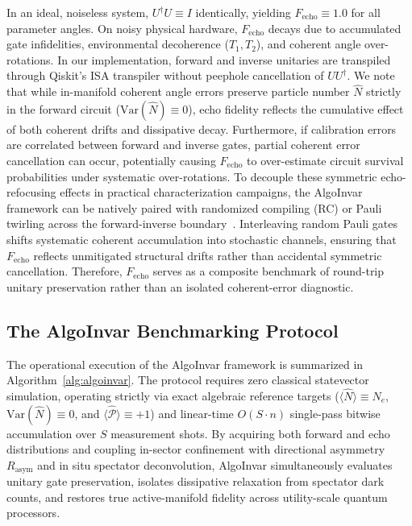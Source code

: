 \documentclass[aps,pra,reprint,superscriptaddress,floatfix,nofootinbib]{revtex4-2}
\begin{document}
In an ideal, noiseless system, $U^\dagger U \equiv I$ identically, yielding $F_{\text{echo}} \equiv 1.0$ for all parameter angles. On noisy physical hardware, $F_{\text{echo}}$ decays due to accumulated gate infidelities, environmental decoherence ($T_1, T_2$), and coherent angle over-rotations. In our implementation, forward and inverse unitaries are transpiled through Qiskit's ISA transpiler without peephole cancellation of $U U^\dagger$. We note that while in-manifold coherent angle errors preserve particle number $\hat{N}$ strictly in the forward circuit ($\text{Var}(\hat{N}) \equiv 0$), echo fidelity reflects the cumulative effect of both coherent drifts and dissipative decay. Furthermore, if calibration errors are correlated between forward and inverse gates, partial coherent error cancellation can occur, potentially causing $F_{\text{echo}}$ to over-estimate circuit survival probabilities under systematic over-rotations. To decouple these symmetric echo-refocusing effects in practical characterization campaigns, the AlgoInvar framework can be natively paired with randomized compiling (RC) or Pauli twirling across the forward-inverse boundary~\cite{Wallman2016,Cai2019}. Interleaving random Pauli gates shifts systematic coherent accumulation into stochastic channels, ensuring that $F_{\text{echo}}$ reflects unmitigated structural drifts rather than accidental symmetric cancellation. Therefore, $F_{\text{echo}}$ serves as a composite benchmark of round-trip unitary preservation rather than an isolated coherent-error diagnostic.

\subsection{The AlgoInvar Benchmarking Protocol}
The operational execution of the AlgoInvar framework is summarized in Algorithm~\ref{alg:algoinvar}. The protocol requires zero classical statevector simulation, operating strictly via exact algebraic reference targets ($\langle \hat{N} \rangle \equiv N_e$, $\text{Var}(\hat{N}) \equiv 0$, and $\langle \hat{\mathcal{P}} \rangle \equiv +1$) and linear-time $O(S \cdot n)$ single-pass bitwise accumulation over $S$ measurement shots. By acquiring both forward and echo distributions and coupling in-sector confinement with directional asymmetry $R_{\text{asym}}$ and in situ spectator deconvolution, AlgoInvar simultaneously evaluates unitary gate preservation, isolates dissipative relaxation from spectator dark counts, and restores true active-manifold fidelity across utility-scale quantum processors.
\end{document}
